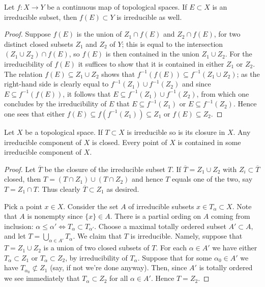 \begin{lemma}
\label{lemma-image-irreducible-space}
Let $f : X \to Y$ be a continuous map of topological spaces.
If $E \subset X$ is an irreducible subset, then $f(E) \subset Y$
is irreducible as well.
\end{lemma}

\begin{proof}
Suppose $f(E)$ is the union of $Z_1 \cap f(E)$ and $Z_2 \cap f(E)$, for two
distinct closed subsets $Z_1$ and $Z_2$ of $Y$; this is equal to the
intersection $(Z_1 \cup Z_2) \cap f(E)$, so $f(E)$ is then contained in the
union $Z_1 \cup Z_2$.  For the irreducibility of $f(E)$ it suffices to show
that it is contained in either $Z_1$ or $Z_2$. The relation
$f(E) \subseteq Z_1 \cup Z_2$ shows that
$f^{-1}(f(E)) \subseteq f^{-1}(Z_1 \cup Z_2)$; as the right-hand side is
clearly equal to $f^{-1}(Z_1) \cup f^{-1}(Z_2)$ and since
$E \subseteq f^{-1}(f(E))$, it follows that
$E \subseteq f^{-1}(Z_1) \cup f^{-1}(Z_2)$, from which one concludes by the
irreducibility of $E$ that $E \subseteq f^{-1}(Z_1)$ or
$E \subseteq f^{-1}(Z_2)$.  Hence one sees that either
$f(E) \subseteq f(f^{-1}(Z_1)) \subseteq Z_1$ or $f(E) \subseteq Z_2$.
\end{proof}

\begin{lemma}
\label{lemma-irreducible}
Let $X$ be a topological space. If $T \subset X$ is irreducible
so is its closure in $X$. Any irreducible component of $X$ is
closed. Every point of $X$ is contained in some irreducible component
of $X$.
\end{lemma}

\begin{proof}
Let $\overline{T}$ be the closure of the irreducible subset $T$.
If $\overline{T} = Z_1 \cup Z_2$ with $Z_i \subset \overline{T}$
closed, then $T = (T\cap Z_1) \cup (T \cap Z_2)$ and hence
$T$ equals one of the two, say $T = Z_1 \cap T$. Thus clearly
$\overline{T} \subset Z_1$ as desired.

\medskip\noindent
Pick a point $x\in X$. Consider the set $A$ of irreducible subsets
$x \in T_\alpha \subset X$. Note that $A$ is nonempty since
$\{x\} \in A$. There is a partial ording on $A$ coming from
inclusion: $\alpha \leq \alpha' \Leftrightarrow T_\alpha \subset T_{\alpha'}$.
Choose a maximal totally ordered subset $A' \subset A$, and let
$T = \bigcup_{\alpha \in A'} T_\alpha$. We claim that $T$ is
irreducible. Namely, suppose that $T =  Z_1 \cup Z_2$ is a union
of two closed subsets of $T$. For each $\alpha \in A'$ we have
either $T_\alpha \subset Z_1$ or $T_\alpha \subset Z_2$, by irreducibility
of $T_\alpha$. Suppose that for some $\alpha_0 \in A'$ we have
$T_{\alpha_0} \not\subset Z_1$ (say, if not we're done anyway).
Then, since $A'$ is totally ordered we see immediately that
$T_\alpha \subset Z_2$ for all $\alpha \in A'$. Hence $T = Z_2$.
\end{proof}

